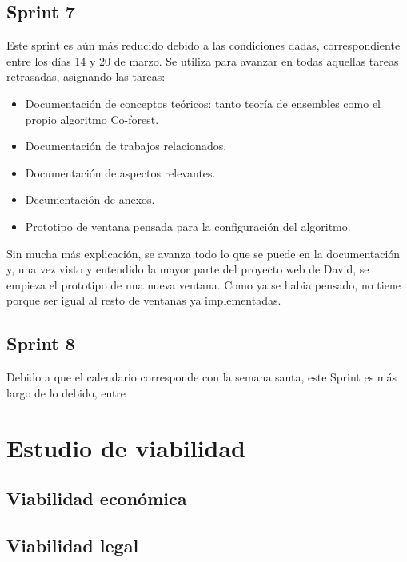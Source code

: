\subsection{Sprint 7}
Este sprint es aún más reducido debido a las condiciones dadas, correspondiente entre los días 14 y 20 de marzo. Se utiliza para avanzar en todas aquellas tareas retrasadas, asignando las tareas:
\begin{itemize}
	\item Documentación de conceptos teóricos: tanto teoría de ensembles como el propio algoritmo Co-forest.
	\item Documentación de trabajos relacionados.
	\item Documentación de aspectos relevantes.
	\item Dccumentación de anexos.
	\item Prototipo de ventana pensada para la configuración del algoritmo.
	
\end{itemize}
Sin mucha más explicación, se avanza todo lo que se puede en la documentación y, una vez visto y entendido la mayor parte del proyecto web de David, se empieza el prototipo de una nueva ventana. Como ya se habia pensado, no tiene porque ser igual al resto de ventanas ya implementadas.

\subsection{Sprint 8}
Debido a que el calendario corresponde con la semana santa, este Sprint es más largo de lo debido, entre 

\section{Estudio de viabilidad}

\subsection{Viabilidad económica}

\subsection{Viabilidad legal}

